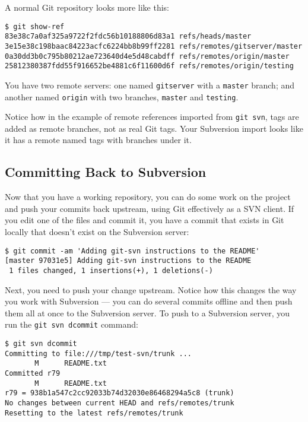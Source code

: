 \documentclass[a4paper]{book}
\begin{document}
A normal Git repository looks more like this:

\begin{shaded}\begin{verbatim}
$ git show-ref
83e38c7a0af325a9722f2fdc56b10188806d83a1 refs/heads/master
3e15e38c198baac84223acfc6224bb8b99ff2281 refs/remotes/gitserver/master
0a30dd3b0c795b80212ae723640d4e5d48cabdff refs/remotes/origin/master
25812380387fdd55f916652be4881c6f11600d6f refs/remotes/origin/testing
\end{verbatim}\end{shaded}

You have two remote servers: one named \texttt{gitserver} with a \texttt{master} branch; and another named \texttt{origin} with two branches, \texttt{master} and \texttt{testing}.

Notice how in the example of remote references imported from \texttt{git svn}, tags are added as remote branches, not as real Git tags. Your Subversion import looks like it has a remote named tags with branches under it.

\subsection{Committing Back to Subversion}\label{committing-back-to-subversion}

Now that you have a working repository, you can do some work on the project and push your commits back upstream, using Git effectively as a SVN client. If you edit one of the files and commit it, you have a commit that exists in Git locally that doesn't exist on the Subversion server:

\begin{shaded}\begin{verbatim}
$ git commit -am 'Adding git-svn instructions to the README'
[master 97031e5] Adding git-svn instructions to the README
 1 files changed, 1 insertions(+), 1 deletions(-)
\end{verbatim}\end{shaded}

Next, you need to push your change upstream. Notice how this changes the way you work with Subversion --- you can do several commits offline and then push them all at once to the Subversion server. To push to a Subversion server, you run the \texttt{git svn dcommit} command:

\begin{shaded}\begin{verbatim}
$ git svn dcommit
Committing to file:///tmp/test-svn/trunk ...
       M      README.txt
Committed r79
       M      README.txt
r79 = 938b1a547c2cc92033b74d32030e86468294a5c8 (trunk)
No changes between current HEAD and refs/remotes/trunk
Resetting to the latest refs/remotes/trunk
\end{verbatim}\end{shaded}
\end{document}
